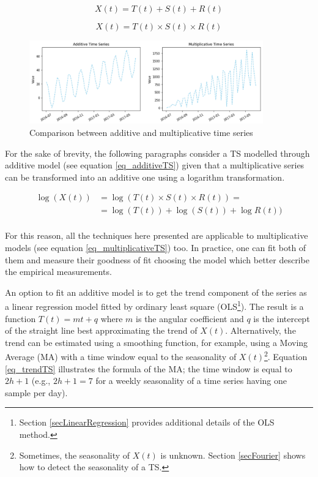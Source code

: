 \begin{equation}
X\left(t\right)=T\left(t\right)+S\left(t\right)+R(t)
\label{eq_additiveTS}
\end{equation}

\begin{equation}
X\left(t\right)=T\left(t\right)\times S\left(t\right)\times R(t)
\label{eq_multiplicativeTS}
\end{equation}

\begin{figure}[hbt!]
\centering
\includegraphics[width=0.9\textwidth]{SectionLetsMath/elemStat_figures/fig_addMulTS.png}
\captionsetup{type=figure}
\caption{Comparison between additive and multiplicative time series}
\label{fig_addMulTS}
\end{figure}

For the sake of brevity, the following paragraphs consider a TS modelled through additive model (see equation \ref{eq_additiveTS}) given that a multiplicative series can be transformed into an additive one using a logarithm transformation.

\begin{equation}
\begin{split}
    \log{\left(X\left(t\right)\right)} & =\log{\left(T\left(t\right)\times S\left(t\right)\times R\left(t\right)\right)}=\\
    & =\log{(T(t))+\log{(S(t))+\log{R(t))}}}\\
\end{split}
\label{eq_additiveMultiplicativeTransform}
\end{equation}

For this reason, all the techniques here presented are applicable to multiplicative models (see equation \ref{eq_multiplicativeTS}) too. In practice, one can fit both of them and measure their goodness of fit choosing the model which better describe the empirical measurements. 

An option to fit an additive model is to get the trend component of the series as a linear regression model fitted by ordinary least square (OLS\footnote{Section \ref{secLinearRegression} provides additional details of the OLS method.}). The result is a function $T\left(t\right)=mt+q$ where $m$ is the angular coefficient and $q$ is the intercept of the straight line best approximating the trend of $X(t)$. Alternatively, the trend can be estimated using a smoothing function, for example, using a Moving Average (MA) with a time window equal to the seasonality of $X(t)$\footnote{Sometimes, the seasonality of $X(t)$ is unknown. Section \ref{secFourier} shows how to detect the seasonality of a TS.}. Equation \ref{eq_trendTS} illustrates the formula of the MA; the time window is equal to $2h+1$ (e.g., $2h+1=7$ for a weekly seasonality of a time series having one sample per day).

